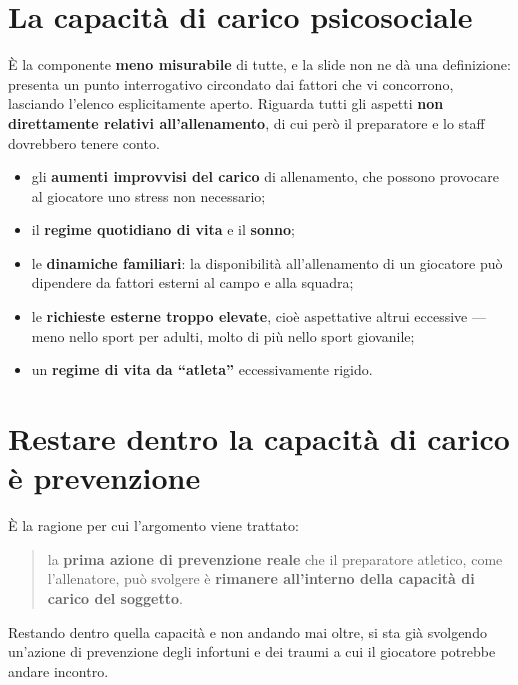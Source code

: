 \section{La capacità di carico psicosociale}

È la componente \textbf{meno misurabile} di tutte, e la slide non ne dà una definizione: presenta un
punto interrogativo circondato dai fattori che vi concorrono, lasciando l'elenco esplicitamente
aperto. Riguarda tutti gli aspetti \textbf{non direttamente relativi all'allenamento}, di cui però
il preparatore e lo staff dovrebbero tenere conto.

\begin{itemize}
  \item gli \textbf{aumenti improvvisi del carico} di allenamento, che possono provocare al
    giocatore uno stress non necessario;
  \item il \textbf{regime quotidiano di vita} e il \textbf{sonno};
  \item le \textbf{dinamiche familiari}: la disponibilità all'allenamento di un giocatore può
    dipendere da fattori esterni al campo e alla squadra;
  \item le \textbf{richieste esterne troppo elevate}, cioè aspettative altrui eccessive --- meno
    nello sport per adulti, molto di più nello sport giovanile;
  \item un \textbf{regime di vita da ``atleta''} eccessivamente rigido.
\end{itemize}

\section{Restare dentro la capacità di carico è prevenzione}

È la ragione per cui l'argomento viene trattato:

\begin{quote}
la \textbf{prima azione di prevenzione reale} che il preparatore atletico, come l'allenatore, può
svolgere è \textbf{rimanere all'interno della capacità di carico del soggetto}.
\end{quote}

Restando dentro quella capacità e non andando mai oltre, si sta già svolgendo un'azione di
prevenzione degli infortuni e dei traumi a cui il giocatore potrebbe andare incontro.

